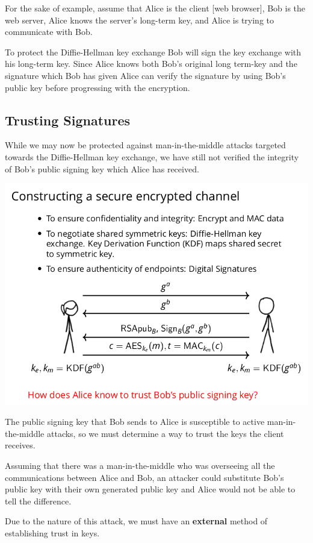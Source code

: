 \documentclass[11pt]{article} %
\begin{document}
For the sake of example, assume that Alice is the client [web browser], Bob is 
the web server, Alice knows the server's long-term key, and Alice is trying to
communicate with Bob.

\bigskip
To protect the Diffie-Hellman key exchange Bob will sign the key exchange with 
his long-term key.  Since Alice knows both Bob's original long term-key and the
signature which Bob has given Alice can verify the signature by using Bob's
public key before progressing with the encryption.

\newpage
\subsection{Trusting Signatures}
While we may now be protected against man-in-the-middle attacks targeted towards
the Diffie-Hellman key exchange, we have still not verified the integrity of
Bob's public signing key which Alice has received.

\includegraphics[scale=.7]{./tls4.png}

The public signing key that Bob sends to Alice is susceptible to
active man-in-the-middle attacks, so we must determine a way to trust the keys 
the client receives.

\bigskip
Assuming that there was a man-in-the-middle who was overseeing all the
communications between Alice and Bob, an attacker could substitute Bob's public
key with their own generated public key and Alice would not be able to tell 
the difference.

\bigskip
Due to the nature of this attack, we must have an \textbf{external} method of
establishing trust in keys.
\end{document}

